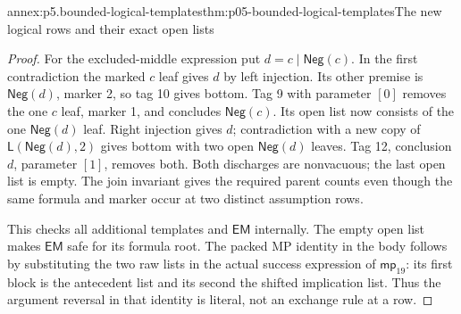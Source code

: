 \begin{annexitem}{annex:p5.bounded-logical-templates}{thm:p05-bounded-logical-templates}{The new logical rows and their exact open lists}
\begin{proof}
For the excluded-middle expression put \(d=c\mathbin{|}\mathsf{Neg}(c)\).
In the first contradiction the marked \(c\) leaf gives \(d\) by left
injection. Its other premise is \(\mathsf{Neg}(d)\), marker 2, so
tag 10 gives bottom. Tag 9 with parameter \([0]\) removes the one
\(c\) leaf, marker 1, and concludes \(\mathsf{Neg}(c)\). Its open
list now consists of the one \(\mathsf{Neg}(d)\) leaf. Right injection
gives \(d\); contradiction with a new copy of
\(\mathsf L(\mathsf{Neg}(d),2)\) gives bottom with two open
\(\mathsf{Neg}(d)\) leaves. Tag 12, conclusion \(d\), parameter
\([1]\), removes both. Both discharges are nonvacuous; the last open
list is empty. The join invariant gives the required parent counts even
though the same formula and marker occur at two distinct assumption rows.

This checks all additional templates and \(\mathsf{EM}\) internally.
The empty open list makes \(\mathsf{EM}\) safe for its formula root.
The packed MP identity in the body follows by substituting the two raw
lists in the actual success expression of \(\mathsf{mp}_{19}\): its
first block is the antecedent list and its second the shifted implication
list. Thus the argument reversal in that identity is literal, not an
exchange rule at a row.
\end{proof}
\end{annexitem}

